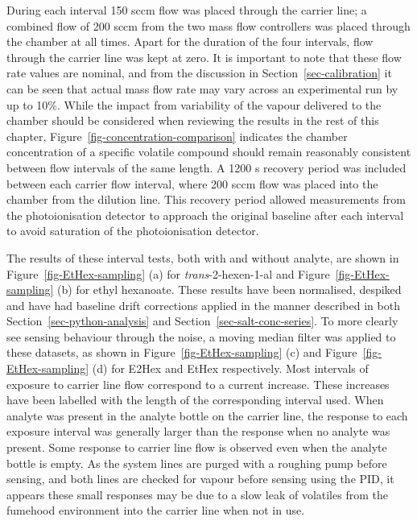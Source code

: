 \documentclass[
  a4paper,
]{scrbook}
\begin{document}
During each interval 150 sccm flow was placed through the carrier line;
a combined flow of 200 sccm from the two mass flow controllers was
placed through the chamber at all times. Apart for the duration of the
four intervals, flow through the carrier line was kept at zero. It is
important to note that these flow rate values are nominal, and from the
discussion in Section~\ref{sec-calibration} it can be seen that actual
mass flow rate may vary across an experimental run by up to 10\%. While
the impact from variability of the vapour delivered to the chamber
should be considered when reviewing the results in the rest of this
chapter, Figure~\ref{fig-concentration-comparison} indicates the chamber
concentration of a specific volatile compound should remain reasonably
consistent between flow intervals of the same length. A 1200 s recovery
period was included between each carrier flow interval, where 200 sccm
flow was placed into the chamber from the dilution line. This recovery
period allowed measurements from the photoionisation detector to
approach the original baseline after each interval to avoid saturation
of the photoionisation detector.

The results of these interval tests, both with and without analyte, are
shown in Figure~\ref{fig-EtHex-sampling} (a) for
\emph{trans}-2-hexen-1-al and Figure~\ref{fig-EtHex-sampling} (b) for
ethyl hexanoate. These results have been normalised, despiked and have
had baseline drift corrections applied in the manner described in both
Section~\ref{sec-python-analysis} and
Section~\ref{sec-salt-conc-series}. To more clearly see sensing
behaviour through the noise, a moving median filter was applied to these
datasets, as shown in Figure~\ref{fig-EtHex-sampling} (c) and
Figure~\ref{fig-EtHex-sampling} (d) for E2Hex and EtHex respectively.
Most intervals of exposure to carrier line flow correspond to a current
increase. These increases have been labelled with the length of the
corresponding interval used. When analyte was present in the analyte
bottle on the carrier line, the response to each exposure interval was
generally larger than the response when no analyte was present. Some
response to carrier line flow is observed even when the analyte bottle
is empty. As the system lines are purged with a roughing pump before
sensing, and both lines are checked for vapour before sensing using the
PID, it appears these small responses may be due to a slow leak of
volatiles from the fumehood environment into the carrier line when not
in use.
\end{document}
